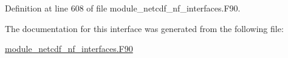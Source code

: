 Definition at line 608 of file module\+\_\+netcdf\+\_\+nf\+\_\+interfaces.\+F90.



The documentation for this interface was generated from the following file\+:\begin{DoxyCompactItemize}
\item 
\hyperlink{module__netcdf__nf__interfaces_8F90}{module\+\_\+netcdf\+\_\+nf\+\_\+interfaces.\+F90}\end{DoxyCompactItemize}
